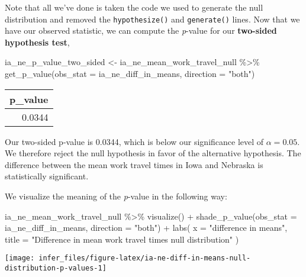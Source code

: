 \documentclass[
]{book}
\newenvironment{Shaded}{\begin{snugshade}}{\end{snugshade}}
\newcommand{\AttributeTok}[1]{\textcolor[rgb]{0.77,0.63,0.00}{#1}}
\newcommand{\FunctionTok}[1]{\textcolor[rgb]{0.00,0.00,0.00}{#1}}
\newcommand{\NormalTok}[1]{#1}
\newcommand{\OtherTok}[1]{\textcolor[rgb]{0.56,0.35,0.01}{#1}}
\newcommand{\SpecialCharTok}[1]{\textcolor[rgb]{0.00,0.00,0.00}{#1}}
\newcommand{\StringTok}[1]{\textcolor[rgb]{0.31,0.60,0.02}{#1}}
\begin{document}
Note that all we've done is taken the code we used to generate the null distribution and removed the \texttt{hypothesize()} and \texttt{generate()} lines.
Now that we have our observed statistic, we can compute the \emph{p}-value for our \textbf{two-sided hypothesis test},

\begin{Shaded}
\begin{Highlighting}[]
\NormalTok{ia\_ne\_p\_value\_two\_sided }\OtherTok{\textless{}{-}}\NormalTok{ ia\_ne\_mean\_work\_travel\_null }\SpecialCharTok{\%\textgreater{}\%}
  \FunctionTok{get\_p\_value}\NormalTok{(}\AttributeTok{obs\_stat =}\NormalTok{ ia\_ne\_diff\_in\_means, }\AttributeTok{direction =} \StringTok{"both"}\NormalTok{)}
\end{Highlighting}
\end{Shaded}

\begin{table}
\centering
\begin{tabular}{r}
\hline
p\_value\\
\hline
0.0344\\
\hline
\end{tabular}
\end{table}

Our two-sided p-value is 0.0344, which is below our significance level of \(\alpha=0.05\). We therefore reject the null hypothesis in favor of the alternative hypothesis. The difference between the mean work travel times in Iowa and Nebraska is statistically significant.

We visualize the meaning of the \emph{p}-value in the following way:

\begin{Shaded}
\begin{Highlighting}[]
\NormalTok{ia\_ne\_mean\_work\_travel\_null }\SpecialCharTok{\%\textgreater{}\%}
  \FunctionTok{visualize}\NormalTok{() }\SpecialCharTok{+}
  \FunctionTok{shade\_p\_value}\NormalTok{(}\AttributeTok{obs\_stat =}\NormalTok{ ia\_ne\_diff\_in\_means, }\AttributeTok{direction =} \StringTok{"both"}\NormalTok{) }\SpecialCharTok{+}
  \FunctionTok{labs}\NormalTok{(}
    \AttributeTok{x =} \StringTok{"difference in means"}\NormalTok{,}
    \AttributeTok{title =} \StringTok{"Difference in mean work travel times null distribution"}
\NormalTok{  )}
\end{Highlighting}
\end{Shaded}

\begin{center}\texttt{[image: infer\_files/figure-latex/ia-ne-diff-in-means-null-distribution-p-values-1]} \end{center}
\end{document}
